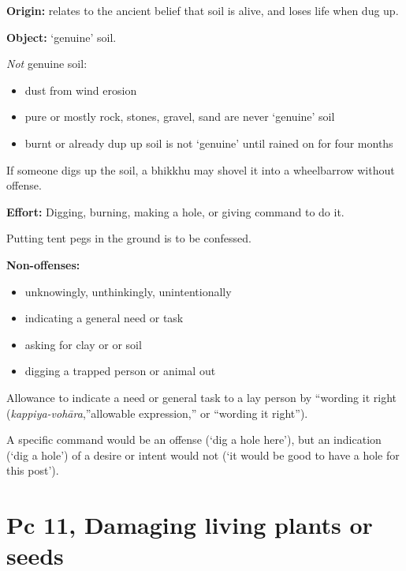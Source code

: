 \begin{multicols}{2}

\textbf{Origin:} relates to the ancient belief that soil is alive, and
loses life when dug up.

\textbf{Object:} `genuine' soil.

\emph{Not} genuine soil:

\begin{itemize}
\tightlist
\item
  dust from wind erosion
\item
  pure or mostly rock, stones, gravel, sand are never `genuine' soil
\item
  burnt or already dup up soil is not `genuine' until rained on for four
  months
\end{itemize}

If someone digs up the soil, a bhikkhu may shovel it into a wheelbarrow
without offense.

\textbf{Effort:} Digging, burning, making a hole, or giving command to
do it.

Putting tent pegs in the ground is to be confessed.

\columnbreak

\textbf{Non-offenses:}

\begin{itemize}
\tightlist
\item
  unknowingly, unthinkingly, unintentionally
\item
  indicating a general need or task
\item
  asking for clay or or soil
\item
  digging a trapped person or animal out
\end{itemize}

Allowance to indicate a need or general task to a lay person by
``wording it right (\emph{kappiya-vohāra},''allowable expression,'' or
``wording it right'').

A specific command would be an offense (`dig a hole here'), but an
indication (`dig a hole') of a desire or intent would not (`it would be
good to have a hole for this post').

\end{multicols}

\section{Pc 11, Damaging living plants or seeds}

